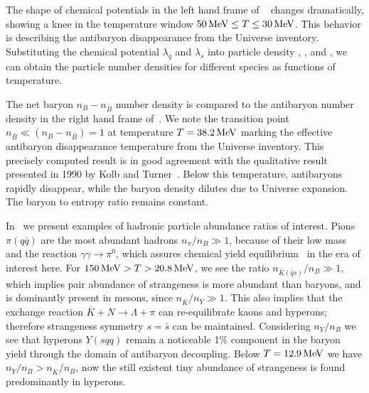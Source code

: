 The shape of chemical potentials in the left hand frame of ~ changes dramatically, showing a knee in the temperature window $50\text{\,MeV}\le T\le 30\text{\,MeV}$. This behavior is describing the antibaryon disappearance from the Universe inventory. Substituting the chemical potential $\lambda_q$ and $\lambda_s$ into particle density , , and , we can obtain the particle number densities for different species as functions of temperature. 

The net baryon $n_B-n_{\overline B}$ number density is compared to the antibaryon number density in the right hand frame of~. We note the transition point $n_{\overline B}\ll(n_B-n_{\overline B})=1$ at temperature $T=38.2\text{\,MeV}$ marking the effective antibaryon disappearance temperature from the Universe inventory. This precisely computed result is in good agreement with the qualitative result presented in 1990 by Kolb and Turner~\cite{Kolb:1990vq}. Below this temperature, antibaryons rapidly disappear, while the baryon density dilutes due to Universe expansion. The baryon to entropy ratio remains constant.

In~ we present examples of hadronic particle abundance ratios of interest. Pions $\pi(q\bar q)$ are the most abundant hadrons $n_\pi/n_B\gg1$, because of their low mass and the reaction $\gamma\gamma\rightarrow\pi^0$, which assures chemical yield equilibrium~\cite{Kuznetsova:2008jt} in the era of interest here. For $150\text{\,MeV}>T>20.8\text{\,MeV}$, we see the ratio $n_{{\overline K}(\bar q s)}/n_B\gg1$, which implies pair abundance of strangeness is more abundant than baryons, and is dominantly present in mesons, since $n_{\overline K}/n_Y\gg1$. This also implies that the exchange reaction $\overline{K}+N\rightarrow \Lambda+\pi$ can re-equilibrate kaons and hyperons; therefore strangeness symmetry $s=\bar s$ can be maintained. Considering $n_Y/n_B$ we see that hyperons $Y(sqq)$ remain a noticeable 1\% component in the baryon yield through the domain of antibaryon decoupling. Below $T=12.9\text{\,MeV}$ we have $n_Y/n_B>n_{\overline K}/n_B$, now the still existent tiny abundance of strangeness is found predominantly in hyperons.

